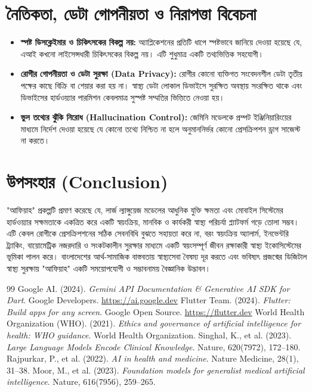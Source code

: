 \documentclass[12pt,a4paper,oneside]{report}
\begin{document}
\section{নৈতিকতা, ডেটা গোপনীয়তা ও নিরাপত্তা বিবেচনা}
\begin{itemize}
    \item \textbf{স্পষ্ট ডিসক্লেইমার ও চিকিৎসকের বিকল্প নয়:} অ্যাপ্লিকেশনের প্রতিটি ধাপে স্পষ্টভাবে জানিয়ে দেওয়া হয়েছে যে, এআই কখনো লাইসেন্সধারী চিকিৎসকের বিকল্প নয়। এটি শুধুমাত্র একটি তথ্যভিত্তিক সহযোগী।
    \item \textbf{রোগীর গোপনীয়তা ও ডেটা সুরক্ষা (Data Privacy):} রোগীর কোনো ব্যক্তিগত সংবেদনশীল ডেটা তৃতীয় পক্ষের কাছে বিক্রি বা শেয়ার করা হয় না। স্বাস্থ্য ডেটা লোকাল ডিভাইসে সুরক্ষিত অবস্থায় সংরক্ষিত থাকে এবং ডিভাইসের হার্ডওয়্যার পারমিশন কেবলমাত্র সুস্পষ্ট সম্মতির ভিত্তিতে নেওয়া হয়।
    \item \textbf{ভুল তথ্যের ঝুঁকি নিরোধ (Hallucination Control):} জেমিনি মডেলকে প্রম্পট ইঞ্জিনিয়ারিংয়ের মাধ্যমে নির্দেশ দেওয়া হয়েছে যে কোনো তথ্যে নিশ্চিত না হলে অনুমাননির্ভর কোনো প্রেসক্রিপশন ড্রাগ সাজেস্ট না করতে।
\end{itemize}

\section{উপসংহার (Conclusion)}
"আফিয়াহ" প্রকল্পটি প্রমাণ করেছে যে, লার্জ ল্যাঙ্গুয়েজ মডেলের আধুনিক যুক্তি ক্ষমতা এবং মোবাইল সিস্টেমের হার্ডওয়্যার সক্ষমতাকে একত্রিত করে একটি স্বয়ংক্রিয়, মানবিক ও কার্যকরী স্বাস্থ্য পরিচর্যা প্ল্যাটফর্ম গড়ে তোলা সম্ভব। এটি কেবল রোগীকে প্রেসক্রিপশনের সঠিক সেবনবিধি বুঝতে সহায়তা করে না, বরং স্বয়ংক্রিয় অ্যালার্ম, ইনভেন্টরি ট্র্যাকিং, বায়োমেট্রিক নজরদারি ও সংকটকালীন সুরক্ষার মাধ্যমে একটি স্বয়ংসম্পূর্ণ জীবন রক্ষাকারী স্বাস্থ্য ইকোসিস্টেমের ভূমিকা পালন করে। বাংলাদেশের আর্থ-সামাজিক বাস্তবতায় স্বাস্থ্যসেবা বৈষম্য দূর করতে এবং ভবিষ্যৎ প্রজন্মের ডিজিটাল স্বাস্থ্য সুরক্ষায় "আফিয়াহ" একটি সময়োপযোগী ও সম্ভাবনাময় বৈজ্ঞানিক উদ্ভাবন।

\begin{thebibliography}{99}
 Google AI. (2024). \textit{Gemini API Documentation \& Generative AI SDK for Dart}. Google Developers. \url{https://ai.google.dev}
 Flutter Team. (2024). \textit{Flutter: Build apps for any screen}. Google Open Source. \url{https://flutter.dev}
 World Health Organization (WHO). (2021). \textit{Ethics and governance of artificial intelligence for health: WHO guidance}. World Health Organization.
 Singhal, K., et al. (2023). \textit{Large Language Models Encode Clinical Knowledge}. Nature, 620(7972), 172--180.
 Rajpurkar, P., et al. (2022). \textit{AI in health and medicine}. Nature Medicine, 28(1), 31--38.
 Moor, M., et al. (2023). \textit{Foundation models for generalist medical artificial intelligence}. Nature, 616(7956), 259--265.
\end{thebibliography}
\end{document}
